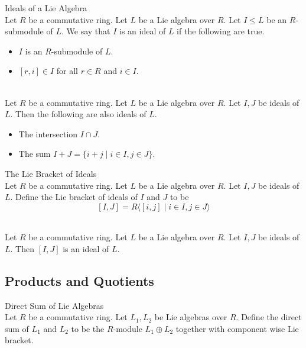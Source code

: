 \documentclass[a4paper]{article}
\begin{document}
\begin{defn}{Ideals of a Lie Algebra}{}\\
Let $R$ be a commutative ring. Let $L$ be a Lie algebra over $R$. Let $I\leq L$ be an $R$-submodule of $L$. We say that $I$ is an ideal of $L$ if the following are true. 
\begin{itemize}
\item $I$ is an $R$-submodule of $L$. 
\item $[r,i]\in I$ for all $r\in R$ and $i\in I$. 
\end{itemize}
\end{defn}

\begin{prp}{}{}\\
Let $R$ be a commutative ring. Let $L$ be a Lie algebra over $R$. Let $I,J$ be ideals of $L$. Then the following are also ideals of $L$. 
\begin{itemize}
\item The intersection $I\cap J$. 
\item The sum $I+J=\{i+j\;|\;i\in I,j\in J\}$. 
\end{itemize}
\end{prp}

\begin{defn}{The Lie Bracket of Ideals}{}\\
Let $R$ be a commutative ring. Let $L$ be a Lie algebra over $R$. Let $I,J$ be ideals of $L$. Define the Lie bracket of ideals of $I$ and $J$ to be $$[I,J]=R\langle[i,j]\;|\;i\in I,j\in J\rangle$$
\end{defn}

\begin{lmm}{}{}\\
Let $R$ be a commutative ring. Let $L$ be a Lie algebra over $R$. Let $I,J$ be ideals of $L$. Then $[I,J]$ is an ideal of $L$. 
\end{lmm}

\subsection{Products and Quotients}
\begin{defn}{Direct Sum of Lie Algebras}{}\\
Let $R$ be a commutative ring. Let $L_1,L_2$ be Lie algebras over $R$. Define the direct sum of $L_1$ and $L_2$ to be the $R$-module $L_1\oplus L_2$ together with component wise Lie bracket. 
\end{defn}
\end{document}
